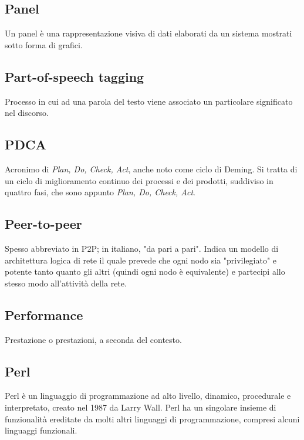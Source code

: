 
	\subsection{Panel}
	\label{sec:panel}
	Un panel è una rappresentazione visiva di dati elaborati da un sistema mostrati sotto forma di grafici.

	\subsection{Part-of-speech tagging}
	\label{sec:post}
	Processo in cui ad una parola del testo viene associato un particolare significato nel discorso.


	\subsection{PDCA}
	\label{sec:pdca}
	Acronimo di \emph{Plan, Do, Check, Act}, anche noto come ciclo di Deming. Si tratta di un ciclo di miglioramento continuo dei processi e dei prodotti, suddiviso in quattro fasi, che sono appunto \emph{Plan, Do, Check, Act}.

	\subsection{Peer-to-peer}
	\label{sec:p2p}
	Spesso abbreviato in P2P; in italiano, "da pari a pari". Indica un modello di architettura logica di rete il quale prevede che ogni nodo sia "privilegiato" e potente tanto quanto gli altri (quindi ogni nodo è equivalente) e partecipi allo stesso modo all'attività della rete.

	\subsection{Performance}
	\label{sec:performance}
	Prestazione o prestazioni, a seconda del contesto.

	\subsection{Perl}
	Perl è un linguaggio di programmazione ad alto livello, dinamico, procedurale e interpretato, creato nel 1987 da Larry Wall. Perl ha un singolare insieme di funzionalità ereditate da molti altri linguaggi di programmazione, compresi alcuni linguaggi funzionali.


